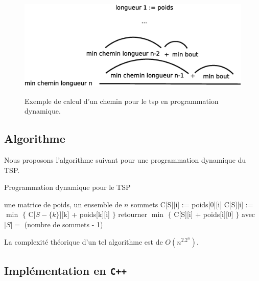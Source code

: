 \begin{figure}[!ht]
\begin{center}
\includegraphics[height=5cm]{../images/tspDyn.eps}
\end{center}
\caption{Exemple de calcul d'un chemin pour le tsp en programmation dynamique.}
\end{figure}

\subsection{Algorithme}

Nous proposons l'algorithme suivant pour une programmation dynamique
du TSP.

\begin{algorithm}[!ht]
\caption{Programmation dynamique pour le TSP}
\label{Dyntsp}
\begin{algorithmic}[1]
\REQUIRE une matrice de poids, un ensemble de $n$ sommets
\STATE C[S][i] := poids[0][i]
\ENDFOR
\ELSE
{}
\STATE C[S][i] := $\min$ $\{$ C[$S - \{ k \} $][k] + poids[k][i] $\}$
\ENDFOR
\ENDFOR
\ENDIF
\ENDFOR
\STATE retourner $\min$ $\{$ C[S][i] + poids[i][0] $\}$ avec $|S| = $
(nombre de sommets - 1)
\end{algorithmic}
\end{algorithm}

La complexité théorique d'un tel algorithme est de $O(n^2.2^n)$.

\subsection{Implémentation en \texttt{C++}}

